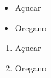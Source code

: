 \documentclass{article}
\begin{document}
\begin{itemize}
	\item Açucar
	\item Oregano
\end{itemize}

\begin{enumerate}
	\item Açucar
	\item Oregano
\end{enumerate}
\end{document}
